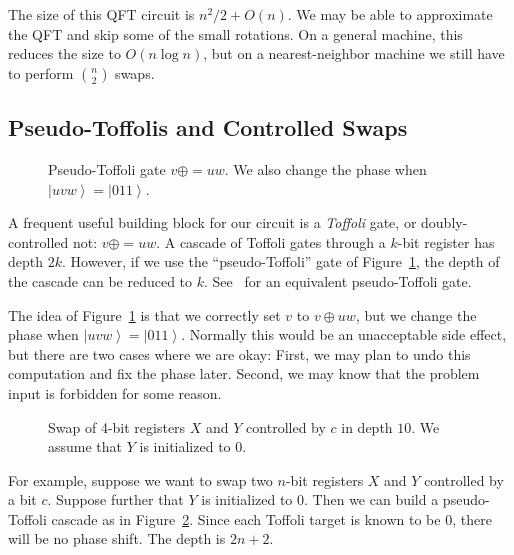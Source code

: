 \documentclass{article} %
\newcommand{\caps}[1]{{\sc #1}}
\newcommand{\xor}{\mathbin{\oplus}}
\newcommand{\xoreq}{\mathbin{\oplus\!=}}
\newcommand{\qu}[1]{{\left| {#1} \right\rangle}}
\newcommand{\QFT}{\caps{QFT}\xspace}
\begin{document}
The size of this {\QFT} circuit is $n^2/2 + O(n)$.  We may be able to
approximate the {\QFT} and skip some of the small rotations.  On a
general machine, this reduces the size to $O(n \log n)$, but on a
nearest-neighbor machine we still have to perform $n \choose 2$
swaps.

\subsection{Pseudo-Toffolis and Controlled Swaps}
\label{prelim-pseudo-sec}

\begin{figure}[h]
\begin{center}

\end{center}
\caption{Pseudo-Toffoli gate $v \xoreq uw$.  We also change
the phase when $\qu{uvw} = \qu{011}$.}
\label{pseudo-fig}
\end{figure}

A frequent useful building block for our circuit is a {\em Toffoli\/}
gate, or doubly-controlled not: $v \xoreq uw$.  A cascade of
Toffoli gates through a $k$-bit register has depth $2k$.  However,
if we use the ``pseudo-Toffoli'' gate of Figure~\ref{pseudo-fig},
the depth of the cascade can be reduced to $k$.
See~\cite{BBCDMSSSW} for an equivalent pseudo-Toffoli gate.

The idea of Figure~\ref{pseudo-fig} is that we correctly set $v$ to
$v \xor uw$, but we change the phase when $\qu{uvw} = \qu{011}$.
Normally this would be an unacceptable side effect, but there are
two cases where we are okay:  First, we may plan to undo this
computation and fix the phase later.  Second, we may know that the
problem input is forbidden for some reason.

\begin{figure}
\begin{center}

\end{center}
\caption{Swap of 4-bit registers $X$ and $Y$ controlled by $c$
in depth $10$.  We assume that $Y$ is initialized to $0$.}
\label{pseudo-cascade-fig}
\end{figure}

For example, suppose we want to swap two $n$-bit registers
$X$ and $Y$ controlled by a bit $c$.  Suppose further that $Y$ is
initialized to $0$.  Then we can build a pseudo-Toffoli cascade
as in Figure~\ref{pseudo-cascade-fig}.  Since each Toffoli target is
known to be $0$, there will be no phase shift.  The depth is $2n + 2$.
\end{document}
